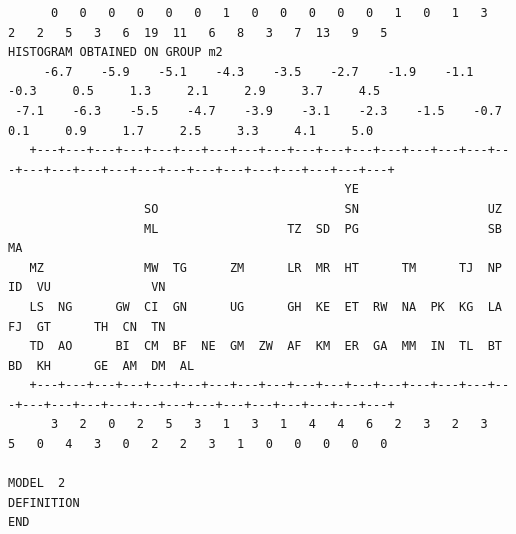 \documentclass[a4paper,10pt,twocolumn]{article}
\begin{document}
\begin{landscape}
\begin{verbatim}
      0   0   0   0   0   0   1   0   0   0   0   0   1   0   1   3   2   2   5   3   6  19  11   6   8   3   7  13   9   5
HISTOGRAM OBTAINED ON GROUP m2
     -6.7    -5.9    -5.1    -4.3    -3.5    -2.7    -1.9    -1.1    -0.3     0.5     1.3     2.1     2.9     3.7     4.5
 -7.1    -6.3    -5.5    -4.7    -3.9    -3.1    -2.3    -1.5    -0.7     0.1     0.9     1.7     2.5     3.3     4.1     5.0
   +---+---+---+---+---+---+---+---+---+---+---+---+---+---+---+---+---+---+---+---+---+---+---+---+---+---+---+---+---+---+
                                               YE
                   SO                          SN                  UZ
                   ML                  TZ  SD  PG                  SB      MA
   MZ              MW  TG      ZM      LR  MR  HT      TM      TJ  NP      ID  VU              VN
   LS  NG      GW  CI  GN      UG      GH  KE  ET  RW  NA  PK  KG  LA      FJ  GT      TH  CN  TN
   TD  AO      BI  CM  BF  NE  GM  ZW  AF  KM  ER  GA  MM  IN  TL  BT      BD  KH      GE  AM  DM  AL
   +---+---+---+---+---+---+---+---+---+---+---+---+---+---+---+---+---+---+---+---+---+---+---+---+---+---+---+---+---+---+
      3   2   0   2   5   3   1   3   1   4   4   6   2   3   2   3   5   0   4   3   0   2   2   3   1   0   0   0   0   0

MODEL  2
DEFINITION
END
\end{verbatim}
\end{landscape}
\newpage
\end{document}
